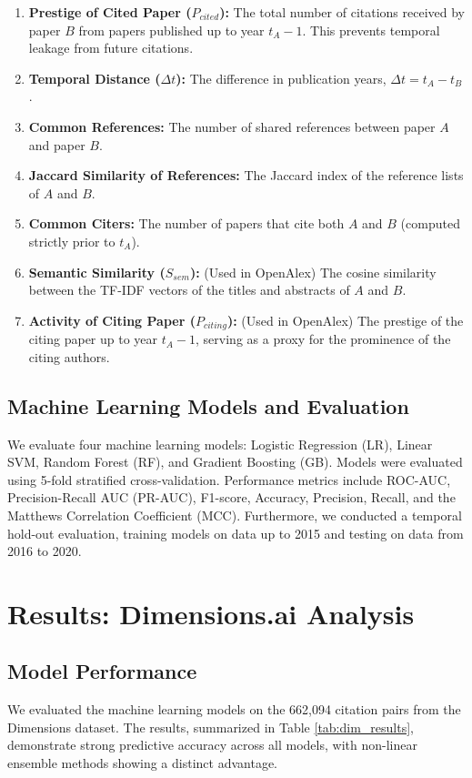 \documentclass[12pt,a4paper]{article}
\begin{document}
\begin{enumerate}
    \item \textbf{Prestige of Cited Paper ($P_{cited}$):} The total number of citations received by paper $B$ from papers published up to year $t_A - 1$. This prevents temporal leakage from future citations.
    \item \textbf{Temporal Distance ($\Delta t$):} The difference in publication years, $\Delta t = t_A - t_B$.
    \item \textbf{Common References:} The number of shared references between paper $A$ and paper $B$.
    \item \textbf{Jaccard Similarity of References:} The Jaccard index of the reference lists of $A$ and $B$.
    \item \textbf{Common Citers:} The number of papers that cite both $A$ and $B$ (computed strictly prior to $t_A$).
    \item \textbf{Semantic Similarity ($S_{sem}$):} (Used in OpenAlex) The cosine similarity between the TF-IDF vectors of the titles and abstracts of $A$ and $B$.
    \item \textbf{Activity of Citing Paper ($P_{citing}$):} (Used in OpenAlex) The prestige of the citing paper up to year $t_A - 1$, serving as a proxy for the prominence of the citing authors.
\end{enumerate}

\subsection{Machine Learning Models and Evaluation}
We evaluate four machine learning models: Logistic Regression (LR), Linear SVM, Random Forest (RF), and Gradient Boosting (GB). Models were evaluated using 5-fold stratified cross-validation. Performance metrics include ROC-AUC, Precision-Recall AUC (PR-AUC), F1-score, Accuracy, Precision, Recall, and the Matthews Correlation Coefficient (MCC). Furthermore, we conducted a temporal hold-out evaluation, training models on data up to 2015 and testing on data from 2016 to 2020.

\section{Results: Dimensions.ai Analysis}

\subsection{Model Performance}
We evaluated the machine learning models on the 662,094 citation pairs from the Dimensions dataset. The results, summarized in Table \ref{tab:dim_results}, demonstrate strong predictive accuracy across all models, with non-linear ensemble methods showing a distinct advantage.
\end{document}
